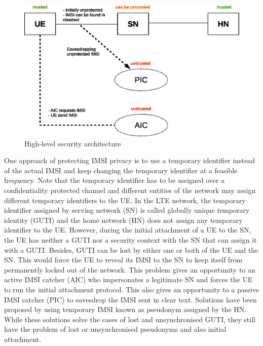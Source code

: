 \documentclass[12pt]{llncs}
\begin{document}
\begin{figure}
\begin{center}
  \includegraphics[width=.98\textwidth]{security_architecture_abstraction.eps}
\caption{High-level security architecture}
\label{fig:security_architecture_abstraction}       %
\end{center}
\end{figure}

One approach of protecting IMSI privacy is to use a temporary identifier instead of the actual IMSI and keep changing the temporary identifier at a feasible frequency. Note that the temporary identifier has to be assigned over a confidentiality protected channel and different entities of the network may assign different temporary identifiers to the UE. In the LTE network, the temporary identifier assigned by serving network (SN) is called globally unique temporary identity (GUTI) and the home network (HN) does not assign any temporary identifier to the UE. However, during the initial attachment of a UE to the SN, the UE has neither a GUTI nor a security context with the SN that can assign it with a GUTI. Besides, GUTI can be lost by either one or both of the UE and the SN. This would force the UE to reveal its IMSI to the SN to keep itself from permanently locked out of the network. This problem gives an opportunity to an active IMSI catcher (AIC) who impersonates a legitimate SN and forces the UE to run the initial attachment protocol. This also gives an opportunity to a passive IMSI catcher (PIC) to eavesdrop the IMSI sent in clear text. Solutions \cite{pseudonym_valtteri_philip, pseudonym_ericsson} have been proposed by using temporary IMSI known as pseudonym assigned by the HN. While these solutions solve the cases of lost and unsynchronised GUTI, they still have the problem of lost or unsynchronised pseudonyms and also initial attachment.
\end{document}
